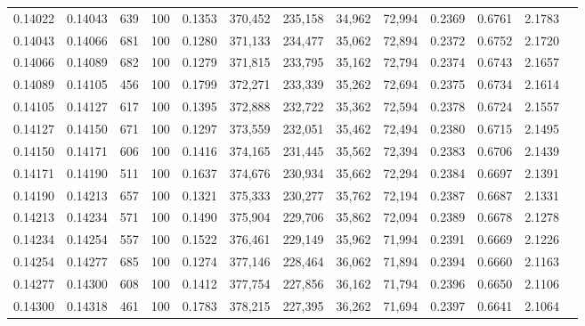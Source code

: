 \begin{tabular}{rrrrrrrrrrrrr}
0.14022 & 0.14043 &   639 & 100 &                                     0.1353 & 370,452 & 235,158 &  34,962 &  72,994 & 0.2369 & 0.6761 & 2.1783 \\
0.14043 & 0.14066 &   681 & 100 &                                     0.1280 & 371,133 & 234,477 &  35,062 &  72,894 & 0.2372 & 0.6752 & 2.1720 \\
0.14066 & 0.14089 &   682 & 100 &                                     0.1279 & 371,815 & 233,795 &  35,162 &  72,794 & 0.2374 & 0.6743 & 2.1657 \\
0.14089 & 0.14105 &   456 & 100 &                                     0.1799 & 372,271 & 233,339 &  35,262 &  72,694 & 0.2375 & 0.6734 & 2.1614 \\
0.14105 & 0.14127 &   617 & 100 &                                     0.1395 & 372,888 & 232,722 &  35,362 &  72,594 & 0.2378 & 0.6724 & 2.1557 \\
0.14127 & 0.14150 &   671 & 100 &                                     0.1297 & 373,559 & 232,051 &  35,462 &  72,494 & 0.2380 & 0.6715 & 2.1495 \\
0.14150 & 0.14171 &   606 & 100 &                                     0.1416 & 374,165 & 231,445 &  35,562 &  72,394 & 0.2383 & 0.6706 & 2.1439 \\
0.14171 & 0.14190 &   511 & 100 &                                     0.1637 & 374,676 & 230,934 &  35,662 &  72,294 & 0.2384 & 0.6697 & 2.1391 \\
0.14190 & 0.14213 &   657 & 100 &                                     0.1321 & 375,333 & 230,277 &  35,762 &  72,194 & 0.2387 & 0.6687 & 2.1331 \\
0.14213 & 0.14234 &   571 & 100 &                                     0.1490 & 375,904 & 229,706 &  35,862 &  72,094 & 0.2389 & 0.6678 & 2.1278 \\
0.14234 & 0.14254 &   557 & 100 &                                     0.1522 & 376,461 & 229,149 &  35,962 &  71,994 & 0.2391 & 0.6669 & 2.1226 \\
0.14254 & 0.14277 &   685 & 100 &                                     0.1274 & 377,146 & 228,464 &  36,062 &  71,894 & 0.2394 & 0.6660 & 2.1163 \\
0.14277 & 0.14300 &   608 & 100 &                                     0.1412 & 377,754 & 227,856 &  36,162 &  71,794 & 0.2396 & 0.6650 & 2.1106 \\
0.14300 & 0.14318 &   461 & 100 &                                     0.1783 & 378,215 & 227,395 &  36,262 &  71,694 & 0.2397 & 0.6641 & 2.1064 \\

\end{tabular}
